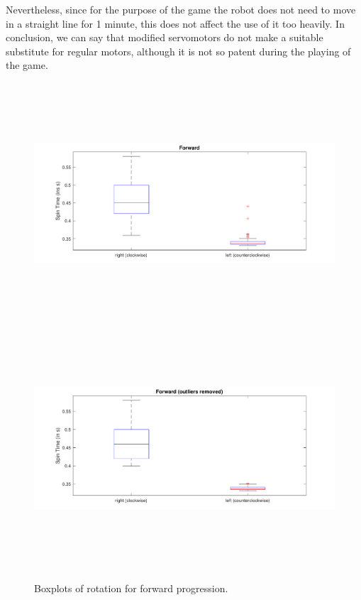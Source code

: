 \documentclass[a4paper,twoside]{book}
\begin{document}
Nevertheless, since for the purpose of the game the robot does not need to move in a straight line for 1 minute, this does not affect the use of it too heavily. 
In conclusion, we can say that modified servomotors do not make a suitable substitute for regular motors, although it is not so patent during the playing of the game.

\begin{figure}[h]

\includegraphics[width=\paperwidth, height=9cm, center]{img/forward} 
\includegraphics[width=\paperwidth, height=9cm, center]{img/forward2}
\caption{Boxplots of rotation for forward progression.}

\end{figure}
\end{document}
